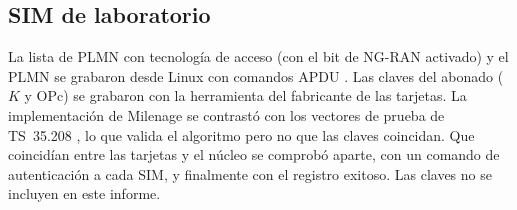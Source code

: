 \subsection{SIM de laboratorio}
La lista de PLMN con tecnología de acceso (con el bit de NG-RAN activado) y el PLMN se grabaron desde Linux con comandos APDU \cite{ts31102}. Las claves del abonado ($K$ y OPc) se grabaron con la herramienta del fabricante de las tarjetas. La implementación de Milenage se contrastó con los vectores de prueba de TS~35.208 \cite{ts35208}, lo que valida el algoritmo pero no que las claves coincidan. Que coincidían entre las tarjetas y el núcleo se comprobó aparte, con un comando de autenticación a cada SIM, y finalmente con el registro exitoso. Las claves no se incluyen en este informe.
